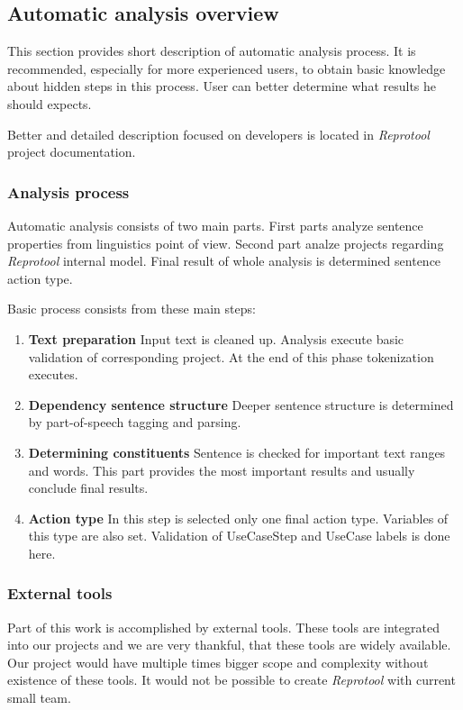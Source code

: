 \subsection{Automatic analysis overview}
This section provides short description of automatic analysis process. It is recommended, especially for more experienced users, to obtain basic knowledge about hidden steps in this process. User can better determine what results he should expects.

Better and detailed description focused on developers is located in \emph{Reprotool} project documentation.

\subsubsection{Analysis process}
Automatic analysis consists of two main parts. First parts analyze sentence properties from linguistics point of view. Second part analze projects regarding \emph{Reprotool} internal model. Final result of whole analysis is determined sentence action type.

Basic process consists from these main steps:

\begin{enumerate}
\item {\bf Text preparation} Input text is cleaned up. Analysis execute basic validation of corresponding project. At the end of this phase tokenization executes.
\item {\bf Dependency sentence structure} Deeper sentence structure is determined by part-of-speech tagging and parsing.
\item {\bf Determining constituents} Sentence is checked for important text ranges and words. This part provides the most important results and usually conclude final results.
\item {\bf Action type} In this step is selected only one final action type. Variables of this type are also set. Validation of UseCaseStep and UseCase labels is done here.
\end{enumerate}

\subsubsection{External tools}

Part of this work is accomplished by external tools. These tools are integrated into our projects and we are very thankful, that these tools are widely available. Our project would have multiple times bigger scope and complexity without existence of these tools. It would not be possible to create \emph{Reprotool} with current small team.

